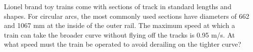 Lionel brand toy trains come with sections of track in
standard lengths and shapes. For circular arcs, the most
commonly used sections have diameters of 662 and 1067 mm at
the inside of the outer rail. The maximum speed at which a
train can take the broader curve without flying off the
tracks is 0.95 m/s. At what speed must the train be operated
to avoid derailing on the tighter curve?\answercheck
